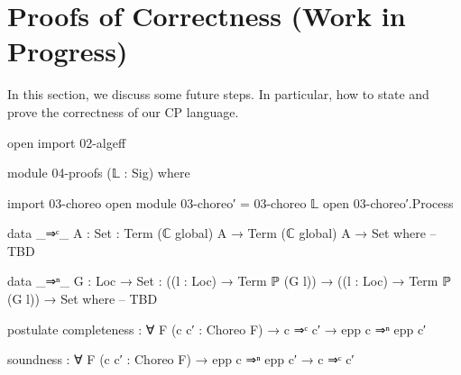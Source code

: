 \section{Proofs of Correctness (Work in Progress)}

In this section, we discuss some future steps. In particular, how to state and prove the correctness of our CP language.

\begin{code}[hide]
open import 02-algeff

module 04-proofs (𝕃 : Sig) where

import 03-choreo
open module 03-choreo′ = 03-choreo 𝕃
open 03-choreo′.Process
\end{code}

\begin{code}
data _⇒ᶜ_ {A : Set} : Term (ℂ global) A → Term (ℂ global) A → Set where
  -- TBD

data _⇒ⁿ_ {G : Loc → Set} :
  ((l : Loc) → Term ℙ (G l)) → ((l : Loc) → Term ℙ (G l)) → Set where
  -- TBD

postulate
  completeness : ∀ {F} (c c′ : Choreo F) →
    c ⇒ᶜ c′ → epp c ⇒ⁿ epp c′

  soundness : ∀ {F} (c c′ : Choreo F) →
    epp c ⇒ⁿ epp c′ → c ⇒ᶜ c′ 
\end{code}

